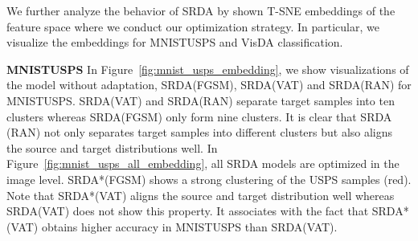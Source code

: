 \documentclass[10pt,twocolumn,letterpaper]{article}
\begin{document}
We further analyze the behavior of SRDA by shown T-SNE embeddings of the feature space where we conduct our optimization strategy. In particular, we visualize the embeddings for MNISTUSPS and VisDA classification.

{\bf MNISTUSPS} In Figure~\ref{fig:mnist_usps_embedding}, we show visualizations of the model without adaptation, SRDA(FGSM), SRDA(VAT) and SRDA(RAN) for MNISTUSPS. SRDA(VAT) and SRDA(RAN) separate target samples into ten clusters whereas SRDA(FGSM) only form nine clusters. It is clear that SRDA (RAN) not only separates target samples into different clusters but also aligns the source and target distributions well. In Figure~\ref{fig:mnist_usps_all_embedding}, all SRDA models are optimized in the image level. SRDA*(FGSM) shows a strong clustering of the USPS samples (red). Note that SRDA*(VAT) aligns the source and target distribution well whereas SRDA(VAT) does not show this property. It associates with the fact that SRDA*(VAT) obtains higher accuracy in MNISTUSPS than SRDA(VAT). 

\begin{figure*}[h]
  \centering
\caption{T-SNE plots of SRDA performed optiimization in the feature space for MNIST (blue)USPS (red).}
  \label{fig:mnist_usps_embedding} \end{figure*}

\begin{figure*}[h]
  \centering
\caption{T-SNE plots of SRDA performed optimization in the image level for MNIST (blue)USPS (red).}
  \label{fig:mnist_usps_all_embedding} \end{figure*}
\end{document}
